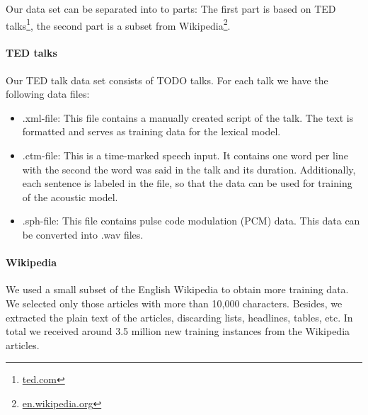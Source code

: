 
Our data set can be separated into to parts:
The first part is based on TED talks\footnote{\url{ted.com}}, the second part is a subset from Wikipedia\footnote{\url{en.wikipedia.org}}.

\paragraph{TED talks} Our TED talk data set consists of TODO talks. For each talk we have the following data files:
\begin{itemize}
	\item .xml-file: This file contains a manually created script of the talk.
	The text is formatted and serves as training data for the lexical model.
	\item .ctm-file: This is a time-marked speech input.
	It contains one word per line with the second the word was said in the talk and its duration.
	Additionally, each sentence is labeled in the file, so that the data can be used for training of the acoustic model.
	\item .sph-file: This file contains pulse code modulation (PCM) data.
	This data can be converted into .wav files.
\end{itemize}

\paragraph{Wikipedia} We used a small subset of the English Wikipedia to obtain more training data.
We selected only those articles with more than 10,000 characters.
Besides, we extracted the plain text of the articles, discarding lists, headlines, tables, etc.
In total we received around 3.5 million new training instances from the Wikipedia articles.
